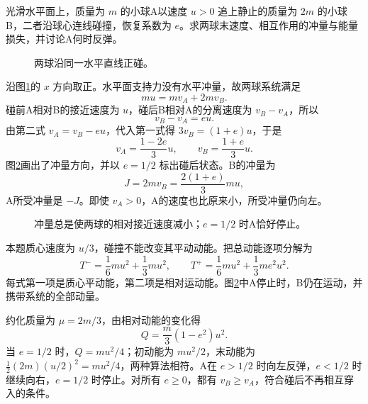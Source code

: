 \begin{example}[正碰中的冲量与能量损失]\label{sup5:problem-example-1}
光滑水平面上，质量为 $m$ 的小球A以速度 $u>0$ 追上静止的质量为 $2m$ 的小球B，二者沿球心连线碰撞，恢复系数为 $e$。求两球末速度、相互作用的冲量与能量损失，并讨论A何时反弹。
\end{example}
\begin{figure}[H]\centering
{}
\caption{两球沿同一水平直线正碰。}\label{sup5:fig:d4-e1-q}
\end{figure}
\begin{solution}
沿图\ref{sup5:fig:d4-e1-q}的 $x$ 方向取正。水平面支持力没有水平冲量，故两球系统满足
\begin{equation}
 mu=mv_A+2mv_B.
\end{equation}
碰前A相对B的接近速度为 $u$，碰后B相对A的分离速度为 $v_B-v_A$，所以
\begin{equation}
 v_B-v_A=eu.
\end{equation}
由第二式 $v_A=v_B-eu$，代入第一式得 $3v_B=(1+e)u$，于是
\begin{equation}
 v_A=\frac{1-2e}{3}u,\qquad v_B=\frac{1+e}{3}u.
\end{equation}
图\ref{sup5:fig:d4-e1-s}画出了冲量方向，并以 $e=1/2$ 标出碰后状态。B的冲量为
\begin{equation}
 J=2mv_B=\frac{2(1+e)}3mu,
\end{equation}
A所受冲量是 $-J$。即使 $v_A>0$，A的速度也比原来小，所受冲量仍向左。
\begin{figure}[H]\centering
{}
\caption{冲量总是使两球的相对接近速度减小；$e=1/2$ 时A恰好停止。}\label{sup5:fig:d4-e1-s}
\end{figure}
本题质心速度为 $u/3$，碰撞不能改变其平动动能。把总动能逐项分解为
\[
T^- =\frac16mu^2+\frac13mu^2,
\qquad
T^+ =\frac16mu^2+\frac13me^2u^2.
\]
每式第一项是质心平动能，第二项是相对运动能。图\ref{sup5:fig:d4-e1-s}中A停止时，B仍在运动，并携带系统的全部动量。

约化质量为 $\mu=2m/3$，由相对动能的变化得
\begin{equation}
 Q=\frac m3(1-e^2)u^2.
\end{equation}
当 $e=1/2$ 时，$Q=mu^2/4$；初动能为 $mu^2/2$，末动能为 $\tfrac12(2m)(u/2)^2=mu^2/4$，两种算法相符。A在 $e>1/2$ 时向左反弹，$e<1/2$ 时继续向右，$e=1/2$ 时停止。对所有 $e\ge0$，都有 $v_B\ge v_A$，符合碰后不再相互穿入的条件。
\end{solution}



